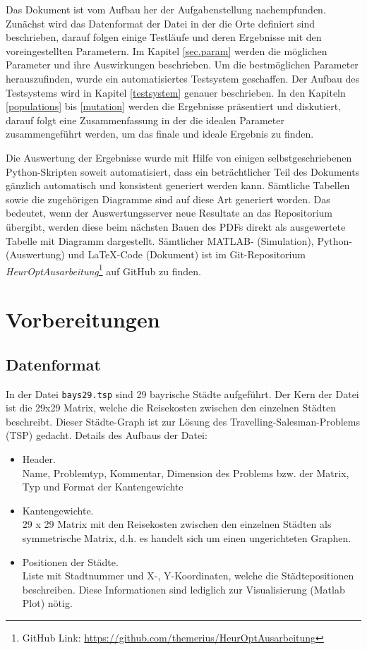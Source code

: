 \noindent Das Dokument ist vom Aufbau her der Aufgabenstellung nachempfunden.
Zunächst wird das Datenformat der Datei in der die Orte definiert sind
beschrieben, darauf folgen einige Testläufe und deren Ergebnisse mit
den voreingestellten Parametern.
Im Kapitel \ref{sec.param} werden die möglichen Parameter und ihre
Auswirkungen beschrieben.
Um die bestmöglichen Parameter herauszufinden, wurde ein automatisiertes
Testsystem geschaffen. Der Aufbau des Testsystems wird in Kapitel
\ref{testsystem} genauer beschrieben.
In den Kapiteln \ref{populations} bis \ref{mutation} werden die Ergebnisse
präsentiert und diskutiert, darauf folgt eine Zusammenfassung in der
die idealen Parameter zusammengeführt werden, um das finale und
ideale Ergebnis zu finden.

Die Auswertung der Ergebnisse wurde mit Hilfe von einigen selbstgeschriebenen
Python-Skripten soweit automatisiert, dass ein beträchtlicher Teil des
Dokuments gänzlich automatisch und konsistent generiert werden kann.
Sämtliche Tabellen sowie die zugehörigen Diagramme sind auf diese Art
generiert worden.
Das bedeutet, wenn der Auswertungsserver neue Resultate an das
Repositorium übergibt, werden diese beim nächsten Bauen des PDFs
direkt als ausgewertete Tabelle mit Diagramm dargestellt.
Sämtlicher MATLAB- (Simulation), Python- (Auswertung) und LaTeX-Code (Dokument)
ist im Git-Repositorium \emph{HeurOptAusarbeitung}\footnote{
GitHub Link: \url{https://github.com/themerius/HeurOptAusarbeitung}} auf GitHub
zu finden. 


\section{Vorbereitungen}


\subsection{Datenformat}

\noindent In der Datei {\tt bays29.tsp} sind 29 bayrische Städte aufgeführt.
Der Kern der Datei ist die 29x29 Matrix, welche die Reisekosten zwischen
den einzelnen Städten beschreibt. Dieser Städte-Graph ist zur Lösung
des Travelling-Salesman-Problems (TSP) gedacht.
Details des Aufbaus der Datei:

\begin{itemize}
  \item Header.\\
  Name, Problemtyp, Kommentar, Dimension des Problems bzw. der Matrix, Typ und Format der Kantengewichte
  \item Kantengewichte.\\
  29 x 29 Matrix mit den Reisekosten zwischen den einzelnen Städten als symmetrische Matrix, d.h. es handelt sich um einen ungerichteten Graphen.
  \item Positionen der Städte.\\
  Liste mit Stadtnummer und X-, Y-Koordinaten, welche die Städtepositionen beschreiben.
  Diese Informationen sind lediglich zur Visualisierung (Matlab Plot) nötig.
\end{itemize}



